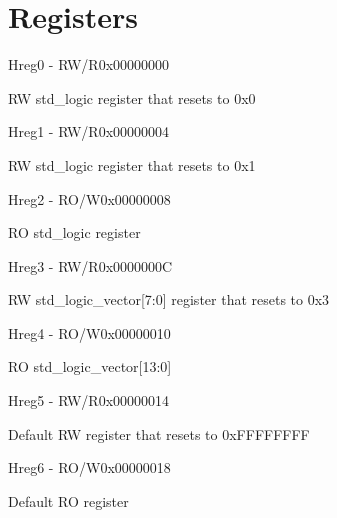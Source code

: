 \documentclass{article}
\begin{document}
\section{Registers}

\begin{register}{H}{reg0 - RW/R}{0x00000000}  \par RW std{\_}logic register that resets to 0x0 \regnewline
  \label{reg0}
\regnewline
\end{register}

\begin{register}{H}{reg1 - RW/R}{0x00000004}  \par RW std{\_}logic register that resets to 0x1 \regnewline
  \label{reg1}
\regnewline
\end{register}

\begin{register}{H}{reg2 - RO/W}{0x00000008}  \par RO std{\_}logic register \regnewline
  \label{reg2}
\regnewline
\end{register}

\begin{register}{H}{reg3 - RW/R}{0x0000000C}  \par RW std{\_}logic{\_}vector[7:0] register that resets to 0x3 \regnewline
  \label{reg3}
\regnewline
\end{register}

\begin{register}{H}{reg4 - RO/W}{0x00000010}  \par RO std{\_}logic{\_}vector[13:0] \regnewline
  \label{reg4}
\regnewline
\end{register}

\begin{register}{H}{reg5 - RW/R}{0x00000014}  \par Default RW register that resets to 0xFFFFFFFF \regnewline
  \label{reg5}
\regnewline
\end{register}

\begin{register}{H}{reg6 - RO/W}{0x00000018}  \par Default RO register \regnewline
  \label{reg6}
\regnewline
\end{register}
\end{document}
